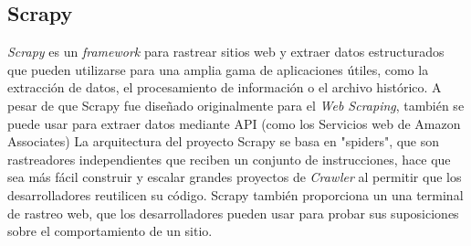 \subsection{Scrapy}
\textit{Scrapy} es un \textit{framework} para rastrear sitios web y extraer datos estructurados que pueden utilizarse para una amplia 
gama de aplicaciones útiles, como la extracción de datos, el procesamiento de información o el archivo histórico.
A pesar de que Scrapy fue diseñado originalmente para el \textit{Web Scraping}, también se puede usar para extraer datos mediante 
API (como los Servicios web de Amazon Associates) %
La arquitectura del proyecto Scrapy se basa en "spiders", que son rastreadores independientes que reciben un conjunto de instrucciones,
hace que sea más fácil construir y escalar grandes proyectos de \textit{Crawler} al permitir que los desarrolladores reutilicen su 
código. Scrapy también proporciona un una terminal de rastreo web, que los desarrolladores pueden usar para probar sus suposiciones 
sobre el comportamiento de un sitio.
